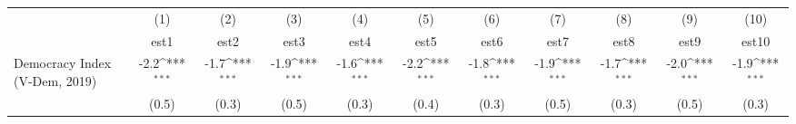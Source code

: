{
\def\sym#1{\ifmmode^{#1}\else\(^{#1}\)\fi}
\begin{tabular}{l*{10}{c}}
                &\multicolumn{1}{c}{(1)}         &\multicolumn{1}{c}{(2)}         &\multicolumn{1}{c}{(3)}         &\multicolumn{1}{c}{(4)}         &\multicolumn{1}{c}{(5)}         &\multicolumn{1}{c}{(6)}         &\multicolumn{1}{c}{(7)}         &\multicolumn{1}{c}{(8)}         &\multicolumn{1}{c}{(9)}         &\multicolumn{1}{c}{(10)}         \\
                &     est1         &     est2         &     est3         &     est4         &     est5         &     est6         &     est7         &     est8         &     est9         &    est10         \\
Democracy Index (V-Dem, 2019)&     -2.2\sym{***}&     -1.7\sym{***}&     -1.9\sym{***}&     -1.6\sym{***}&     -2.2\sym{***}&     -1.8\sym{***}&     -1.9\sym{***}&     -1.7\sym{***}&     -2.0\sym{***}&     -1.9\sym{***}\\
                &    (0.5)         &    (0.3)         &    (0.5)         &    (0.3)         &    (0.4)         &    (0.3)         &    (0.5)         &    (0.3)         &    (0.5)         &    (0.3)         \\
\end{tabular}
}
